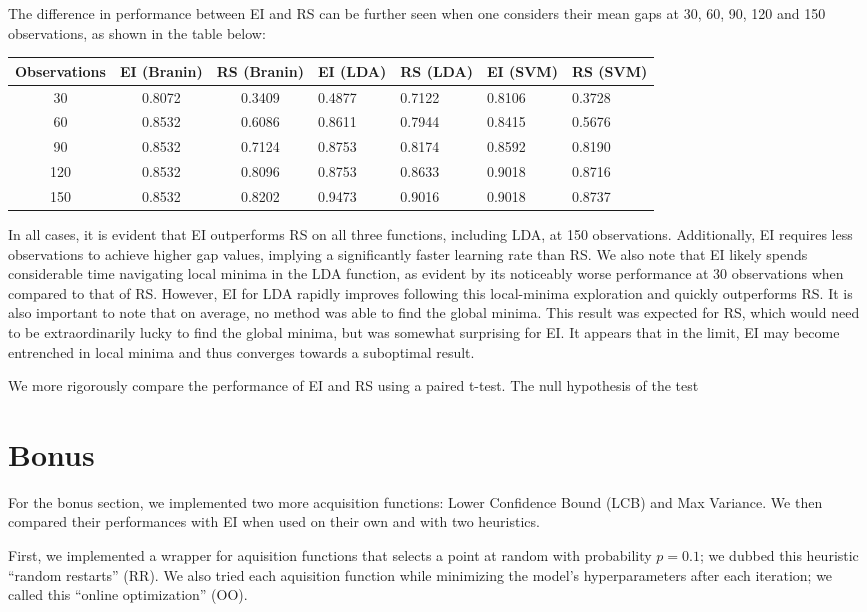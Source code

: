 \documentclass[11pt]{article}
\numberwithin{equation}{section}
\begin{document}
The difference in performance between EI and RS can be further seen when one considers their mean gaps at 30, 60, 90, 120 and 150 observations, 
as shown in the table below:
\begin{center}
  \begin{tabular}{ |c|c|c| } 
   \hline
   Observations & EI (Branin)& RS (Branin) & EI (LDA)& RS (LDA) & EI (SVM)& RS (SVM)\\ 
    & 0.8072 & 0.3409 & 0.4877 & 0.7122 & 0.8106 & 0.3728 \\ 
    & 0.8532 & 0.6086 & 0.8611 & 0.7944 & 0.8415 & 0.5676 \\ 
    & 0.8532 & 0.7124 & 0.8753 & 0.8174 & 0.8592 & 0.8190 \\ 
    & 0.8532 & 0.8096 & 0.8753 & 0.8633 & 0.9018 & 0.8716 \\ 
    & 0.8532 & 0.8202 & 0.9473 & 0.9016 & 0.9018 & 0.8737 \\ 
  \end{tabular}
  \caption{Mean Gaps of EI and RS on the Branin, LDA, and SVM Functions at 30, 60, 90, 120 and 150 observations. 
  Note that EI reaches a higher Gap at 150 observations in all functions when compared to RS. Furthermore, for the Branin and SVM functions, 
  EI achieves these higher values significantly faster than RS.}
  \label{}
\end{center}
In all cases, it is evident that EI outperforms RS on all three functions, including LDA, at 150 observations. 
Additionally, EI requires less observations to achieve higher gap values, implying a significantly faster learning rate than RS.
We also note that EI likely spends considerable time navigating local minima in the LDA function, 
as evident by its noticeably worse performance at 30 observations when compared to that of RS. 
However, EI for LDA rapidly improves following this local-minima exploration and quickly outperforms RS. 
It is also important to note that on average, no method was able to find the global minima. 
This result was expected for RS, which would need to be extraordinarily lucky to find the global minima, but was somewhat surprising for EI.
It appears that in the limit, EI may become entrenched in local minima and thus converges towards a suboptimal result. 

We more rigorously compare the performance of EI and RS using a paired t-test. The null hypothesis of the test 


\section*{Bonus}
For the bonus section, we implemented two more acquisition functions: Lower
Confidence Bound (LCB) and Max Variance. We then compared their performances
with EI when used on their own and with two heuristics.

First, we implemented a wrapper for aquisition functions that selects a point
at random with probability $p = 0.1$; we dubbed this heuristic ``random
restarts'' (RR). We also tried each aquisition function while minimizing the
model's hyperparameters after each iteration; we called this ``online
optimization'' (OO). 
\end{document}

